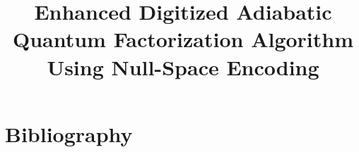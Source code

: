 \documentclass{dissertation}
\newcommand{\1}{\mathbbm{1}}
\begin{document}
\title{Enhanced Digitized Adiabatic Quantum Factorization Algorithm Using Null-Space Encoding}

\frontmatter




\thispagestyle{empty}
\tableofcontents
\let\cleardoublepage\clearpage



\mainmatter

\thumbtrue
























\appendix







\thumbfalse



\chapter*{Bibliography}




\end{document}
